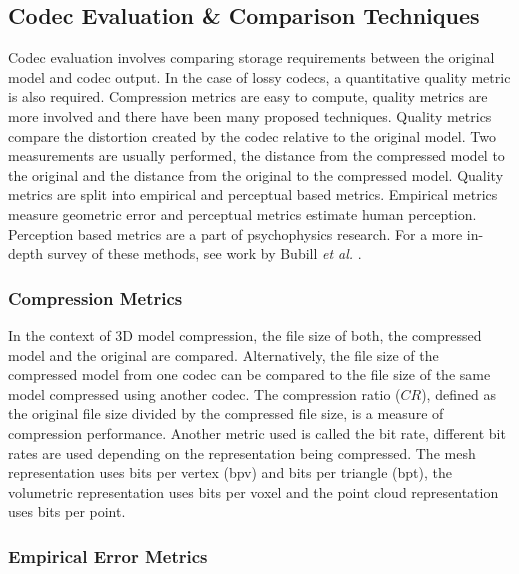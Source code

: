 \subsection{Codec Evaluation \& Comparison Techniques}

Codec evaluation involves comparing storage requirements between the original model and codec output. In the case of lossy codecs, a quantitative quality metric is also required. Compression metrics are easy to compute, quality metrics are more involved and there have been many proposed techniques. Quality metrics compare the distortion created by the codec relative to the original model. Two measurements are usually performed, the distance from the compressed model to the original and the distance from the original to the compressed model. Quality metrics are split into empirical and perceptual based metrics. Empirical metrics measure geometric error and perceptual metrics estimate human perception. Perception based metrics are a part of psychophysics research. For a more in-depth survey of these methods, see work by Bubill \textit{et al.} \cite{Bulbul11Assessing}.

\subsubsection{Compression Metrics}

In the context of 3D model compression, the file size of both, the compressed model and the original are compared. Alternatively, the file size of the compressed model from one codec can be compared to the file size of the same model compressed using another codec. The compression ratio ($CR$), defined as the original file size divided by the compressed file size, is a measure of compression performance. Another metric used is called the bit rate, different bit rates are used depending on the representation being compressed. The mesh representation uses bits per vertex (bpv) and bits per triangle (bpt), the volumetric representation uses bits per voxel and the point cloud representation uses bits per point.

\subsubsection{Empirical Error Metrics}


